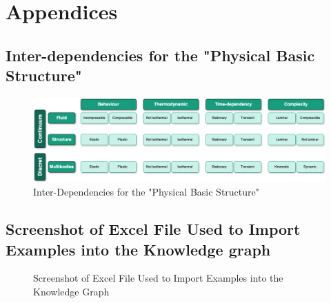 \appendix

\section*{Appendices}
\renewcommand{\thesubsection}{\Alph{subsection}}

\label{annex:framework}

\subsection{Inter-dependencies for the "Physical Basic Structure" \label{annex:phy-bas-struc}}

\begin{figure}[h]
    \centering
    \includegraphics[width=\textwidth]{images/Concept-PhysicalInterdependencies.drawio.png}
    \caption{\label{fig:phy-bas-struc}  Inter-Dependencies for the "Physical Basic Structure" \cite{assistSim}}
\end{figure}


\subsection{Screenshot of Excel File Used to Import Examples into the Knowledge graph\label{annex:screen-excel}}

\begin{figure}[h]
    \centering
    \caption{\label{fig:screen-excel} Screenshot of Excel File Used to Import Examples into the Knowledge Graph}
\end{figure}



